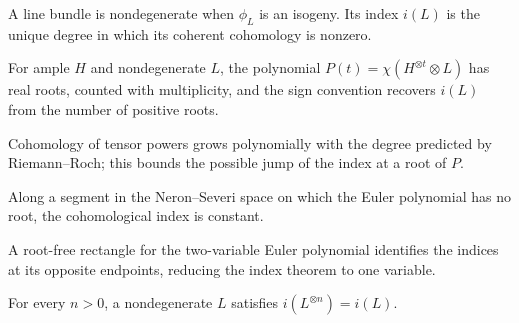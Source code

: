 \begin{definition}
\label{mumford3-index-definition}
A line bundle is nondegenerate when $\phi_L$ is an isogeny.  Its index $i(L)$
is the unique degree in which its coherent cohomology is nonzero.
\notready
\end{definition}

\begin{theorem}
\label{mumford3-index-polynomial-theorem}
For ample $H$ and nondegenerate $L$, the polynomial
$P(t)=\chi(H^{\otimes t}\otimes L)$ has real roots, counted with multiplicity,
and the sign convention recovers $i(L)$ from the number of positive roots.
\notready
\end{theorem}

\begin{lemma}
\label{mumford3-index-growth-lemma}
Cohomology of tensor powers grows polynomially with the degree predicted by
Riemann--Roch; this bounds the possible jump of the index at a root of $P$.
\notready
\end{lemma}

\begin{lemma}
\label{mumford3-index-step-a}
Along a segment in the Neron--Severi space on which the Euler polynomial has no
root, the cohomological index is constant.
\notready
\end{lemma}

\begin{lemma}
\label{mumford3-index-step-b}
A root-free rectangle for the two-variable Euler polynomial identifies the
indices at its opposite endpoints, reducing the index theorem to one variable.
\notready
\end{lemma}

\begin{corollary}
\label{mumford3-index-power-corollary}
For every $n>0$, a nondegenerate $L$ satisfies $i(L^{\otimes n})=i(L)$.
\notready
\end{corollary}

